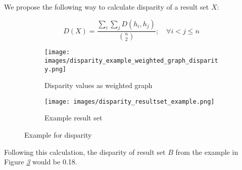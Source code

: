 We propose the following way to calculate disparity of a result set $X$:

\[D(X) = \frac{\sum_{i}^{}\sum_{j}^{} D(h_i, h_j)}{\binom{n}{2}}; \quad \forall i<j \leq n\]

\begin{figure}[tb]
    \centering
    \begin{subfigure}{.3\textwidth}
        \centering
        \texttt{[image: images/disparity\_example\_weighted\_graph\_disparity.png]}
        \caption{Disparity values as weighted graph}
        \label{subfig:disparity_weighted_graph}
    \end{subfigure}
    \begin{subfigure}{.3\textwidth}
        \centering
        \texttt{[image: images/disparity\_resultset\_example.png]}
        \caption{Example result set}
        \label{subfig:disparity_resultset_example}
    \end{subfigure}

    \caption{Example for disparity}
    \label{fig:disparity_example}
\end{figure}

Following this calculation, the disparity of result set $B$ from the example in Figure \textit{\ref{fig:disparity_example}} would be 0.18.
